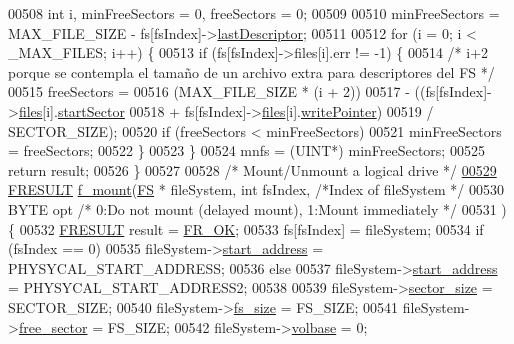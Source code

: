 \begin{DoxyCode}
00508   \textcolor{keywordtype}{int} i, minFreeSectors = 0, freeSectors = 0;
00509 
00510   minFreeSectors = MAX\_FILE\_SIZE - fs[fsIndex]->\hyperlink{structFS_a050f921ab2140aa4eadce4a140b61fbe}{lastDescriptor};
00511 
00512   \textcolor{keywordflow}{for} (i = 0; i < \_MAX\_FILES; i++) \{
00513     \textcolor{keywordflow}{if} (fs[fsIndex]->files[i].err != -1) \{
00514       \textcolor{comment}{/* i+2 porque se contempla el tamaño de un archivo extra para descriptores del FS */}
00515       freeSectors =
00516           (MAX\_FILE\_SIZE * (i + 2))
00517               - ((fs[fsIndex]->\hyperlink{structFS_a5772298ea6aafc77f842037933531a02}{files}[i].\hyperlink{structFIL_a684d4d555f293b08b8396c35e20706d3}{startSector}
00518                   + fs[fsIndex]->\hyperlink{structFS_a5772298ea6aafc77f842037933531a02}{files}[i].\hyperlink{structFIL_a89e92b4845c72b4f9f119b38d1142a41}{writePointer})
00519                   / SECTOR\_SIZE);
00520       \textcolor{keywordflow}{if} (freeSectors < minFreeSectors)
00521         minFreeSectors = freeSectors;
00522     \}
00523   \}
00524   mnfs = (UINT*) minFreeSectors;
00525   \textcolor{keywordflow}{return} result;
00526 \}
00527 
00528 \textcolor{comment}{/* Mount/Unmount a logical drive */}
\hypertarget{fileSystem_8c_source_l00529}{}\hyperlink{fileSystem_8h_a06b1816d729a1ee702209d4ddc1d91af}{00529} \hyperlink{fileSystem_8h_a49d0171ecbd362cda5680a0d360db44c}{FRESULT} \hyperlink{fileSystem_8c_a06b1816d729a1ee702209d4ddc1d91af}{f\_mount}(\hyperlink{structFS}{FS} * fileSystem, \textcolor{keywordtype}{int} fsIndex, \textcolor{comment}{/*Index of fileSystem */}
00530 BYTE opt \textcolor{comment}{/* 0:Do not mount (delayed mount), 1:Mount immediately */}
00531 ) \{
00532   \hyperlink{fileSystem_8h_a49d0171ecbd362cda5680a0d360db44c}{FRESULT} result = \hyperlink{fileSystem_8h_a49d0171ecbd362cda5680a0d360db44ca62fce5cd9df008f8fc85f99706bda5f1}{FR\_OK};
00533   fs[fsIndex] = fileSystem;
00534   \textcolor{keywordflow}{if} (fsIndex == 0)
00535     fileSystem->\hyperlink{structFS_a22eed025311346b8029d8b445c192b95}{start\_address} = PHYSYCAL\_START\_ADDRESS;
00536   \textcolor{keywordflow}{else}
00537     fileSystem->\hyperlink{structFS_a22eed025311346b8029d8b445c192b95}{start\_address} = PHYSYCAL\_START\_ADDRESS2;
00538 
00539   fileSystem->\hyperlink{structFS_a06559d64af1c2b15af05165f30c59868}{sector\_size} = SECTOR\_SIZE;
00540   fileSystem->\hyperlink{structFS_ab8f2ed716ba1865bff2fe82d36e90546}{fs\_size} = FS\_SIZE;
00541   fileSystem->\hyperlink{structFS_adae8dcbe72b934a870bf663481207e3e}{free\_sector} = FS\_SIZE;
00542   fileSystem->\hyperlink{structFS_a6b431a5035eb3bb668565772a3ecd57a}{volbase} = 0;

\end{DoxyCode}
